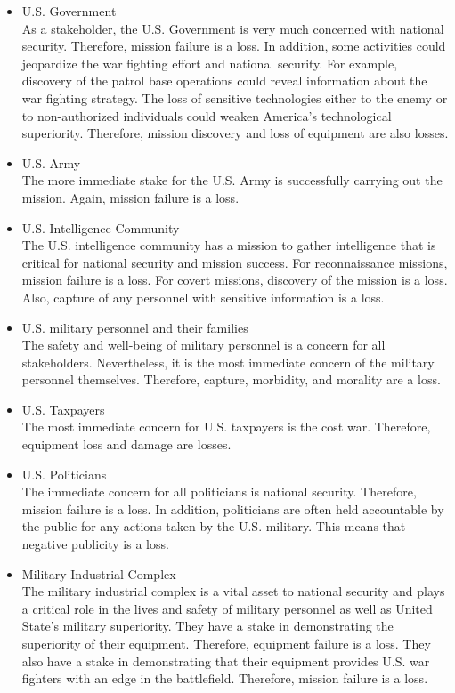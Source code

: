 \documentclass[../../main/main.tex]{subfiles}
\begin{document}
\begin{itemize}
\item U.S. Government\\
As a stakeholder, the U.S. Government is very much concerned with national security. Therefore, mission failure is a loss.  In addition, some activities could jeopardize the war fighting effort and national security.  For example, discovery of the patrol base operations could reveal information about the war fighting strategy.  The loss of sensitive technologies either to the enemy or to non-authorized individuals could weaken America's technological superiority.  Therefore, mission discovery and loss of equipment are also losses.  
\item U.S. Army\\
The more immediate stake for the U.S. Army is successfully carrying out the mission.  Again, mission failure is a loss.
\item U.S. Intelligence Community\\
The U.S. intelligence community has a mission to gather intelligence that is critical for national security and mission success.  For reconnaissance missions, mission failure is a loss. For covert missions, discovery of the mission is a loss.  Also, capture of any personnel with sensitive information is a loss. 
\item U.S. military personnel and their families\\
The safety and well-being of military personnel is a concern for all stakeholders.  Nevertheless, it is the most immediate concern of the military personnel themselves.  Therefore, capture, morbidity, and morality are a loss.
\item U.S. Taxpayers\\
The most immediate concern for U.S. taxpayers is the cost war.  Therefore, equipment loss and damage are losses.  
\item U.S. Politicians\\
The immediate concern for all politicians is national security.  Therefore, mission failure is a loss.   In addition, politicians are often held accountable by the public for any actions taken by the U.S. military.  This means that negative publicity is a loss.  
\item Military Industrial Complex\\
The military industrial complex is a vital asset to national security and plays a critical role in the lives and safety of military personnel as well as United State's military superiority.  They have a stake in demonstrating the superiority of their equipment.  Therefore, equipment failure is a loss.  They also have a stake in demonstrating that their equipment provides U.S. war fighters with an edge in the battlefield.  Therefore, mission failure is a loss.

\end{itemize}
\end{document}
